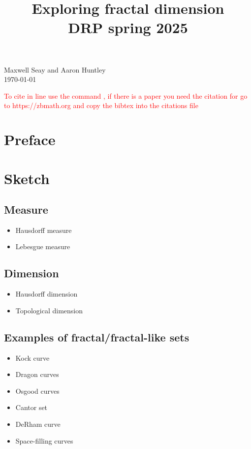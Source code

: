 \documentclass[11pt]{ekblite}
\newcommand\aaron[1]{\textcolor{red}{#1}}
\begin{document}
\title{Exploring fractal dimension\\
DRP spring 2025}
\maketitle
\begin{center}
Maxwell Seay and Aaron Huntley\\
\today
\end{center}

\tableofcontents

\aaron{To cite in line use the command \cite{falconer1}, if there is a paper you need the citation for go to https://zbmath.org and copy the bibtex into the citations file}
\newpage

\section{Preface}
    \section{Sketch}
		\subsection{Measure}
		\begin{itemize}
			\item Hausdorff measure
			\item Lebesgue measure
		\end{itemize}
		\subsection{Dimension}
		\begin{itemize}
			\item Hausdorff dimension
			\item Topological dimension
		\end{itemize}
		\subsection{Examples of fractal/fractal-like sets}
		\begin{itemize}
			\item Kock curve
			\item Dragon curves
			\item Osgood curves
			\item Cantor set
			\item DeRham curve
			\item Space-filling curves
		\end{itemize}
\end{document}
